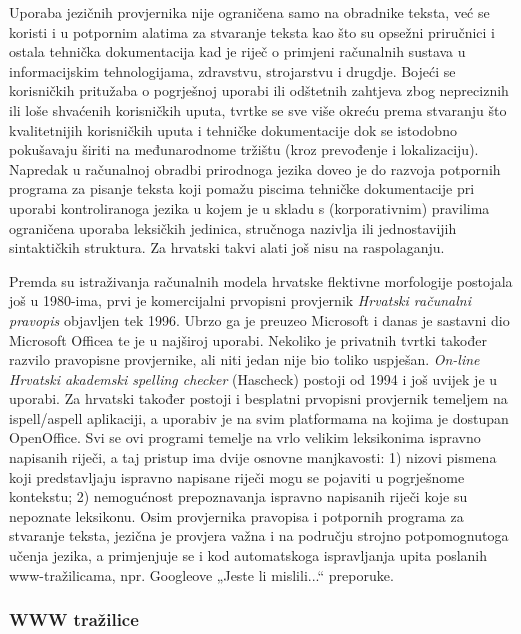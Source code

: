 \begin{multicols}{2}
Uporaba jezičnih provjernika nije ograničena samo na obradnike teksta, već se koristi i u potpornim alatima za stvaranje teksta kao što su opsežni priručnici i ostala tehnička dokumentacija kad je riječ o primjeni računalnih sustava u informacijskim tehnologijama, zdravstvu, strojarstvu i drugdje. Bojeći se korisničkih pritužaba o pogrješnoj uporabi ili odštetnih zahtjeva zbog nepreciznih ili loše shvaćenih korisničkih uputa, tvrtke se sve više okreću prema stvaranju što kvalitetnijih korisničkih uputa i tehničke dokumentacije dok se istodobno pokušavaju širiti na međunarodnome tržištu (kroz prevođenje i lokalizaciju). Napredak u računalnoj obradbi prirodnoga jezika doveo je do razvoja potpornih programa za pisanje teksta koji pomažu piscima tehničke dokumentacije pri uporabi kontroliranoga jezika u kojem je u skladu s (korporativnim) pravilima ograničena uporaba leksičkih jedinica, stručnoga nazivlja ili jednostavijih sintaktičkih struktura. Za hrvatski takvi alati još nisu na raspolaganju.


Premda su istraživanja računalnih modela hrvatske flektivne morfologije postojala još u 1980-ima, prvi je komercijalni prvopisni provjernik \emph{Hrvatski računalni pravopis} objavljen tek 1996. \cite{boo2} Ubrzo ga je preuzeo Microsoft i danas je sastavni dio Microsoft Officea te je u najširoj uporabi. Nekoliko je privatnih tvrtki također razvilo pravopisne provjernike, ali niti jedan nije bio toliko uspješan. \emph{On-line Hrvatski akademski spelling checker} (Hascheck) \cite{str13} postoji od 1994 i još uvijek je u uporabi. Za hrvatski također postoji i besplatni prvopisni provjernik temeljem na ispell/aspell aplikaciji, a uporabiv je na svim platformama na kojima je dostupan OpenOffice. Svi se ovi programi temelje na vrlo velikim leksikonima ispravno napisanih riječi, a taj pristup ima dvije osnovne manjkavosti: 1) nizovi pismena koji predstavljaju ispravno napisane riječi mogu se pojaviti u pogrješnome kontekstu; 2) nemogućnost prepoznavanja ispravno napisanih riječi koje su nepoznate leksikonu. Osim provjernika pravopisa i potpornih programa za stvaranje teksta, jezična je provjera važna i na području strojno potpomognutoga učenja jezika, a primjenjuje se i kod automatskoga ispravljanja upita poslanih www-tražilicama, npr. Googleove „Jeste li mislili...“ preporuke. 


\subsubsection{WWW tražilice}


\end{multicols}
